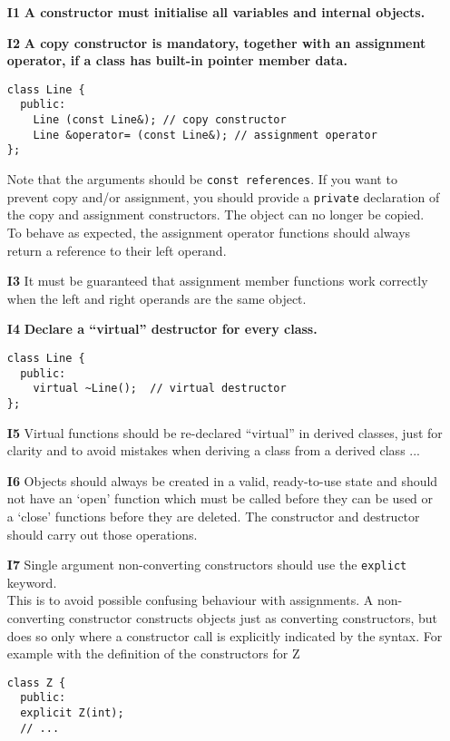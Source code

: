 \begin{itemize}
\item[\bf I1] {\bf A constructor must initialise all variables and internal
  objects.}
\item[\bf I2] {\bf A copy constructor is mandatory, together with an assignment
  operator, if a class has built-in pointer member data.}
  \begin{verbatim}
class Line {
  public:
    Line (const Line&); // copy constructor
    Line &operator= (const Line&); // assignment operator
};
  \end{verbatim}
  Note that the arguments should be {\tt const references}. If you want to
  prevent copy and/or assignment, you should provide a {\tt private} 
  declaration of the copy and assignment constructors. The object can no
  longer be copied.\\
  To behave as expected, the assignment operator functions should always 
  return a reference to their left operand.
\item[\bf I3] It must be guaranteed that assignment member functions work 
  correctly when the left and right operands are the same object. 
\item[\bf I4] {\bf Declare a ``virtual'' destructor for every class.}
  \begin{verbatim}
class Line {
  public:
    virtual ~Line();  // virtual destructor
};
  \end{verbatim}
\item[\bf I5] Virtual functions should be re-declared ``virtual'' in derived
  classes, just for clarity and to avoid mistakes when deriving a class from
  a derived class ...
\item[\bf I6] Objects should always be created in a valid, ready-to-use state 
  and should not have an `open' function which must be called
  before they can be used or a `close' functions before they are deleted.
  The constructor and destructor should carry out those operations.
\item[\bf I7] Single argument non-converting constructors should use 
  the {\tt explict} keyword.\\
  This is to avoid possible confusing behaviour with assignments. A 
  non-converting constructor constructs objects just as converting 
  constructors, but does so only where a constructor call is explicitly 
  indicated by the syntax. For example with the definition of the 
  constructors for Z 
  \begin{verbatim}
class Z {
  public:
  explicit Z(int);
  // ...

\end{verbatim}
\end{itemize}
